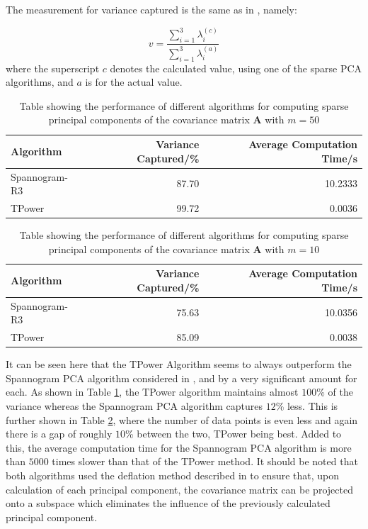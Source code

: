 \documentclass[11pt,a4paper]{article}
\begin{document}
The measurement for variance captured is the same as in \cite{dimakis}, namely:

\begin{equation*}
v = \frac{\sum_{i=1}^3\lambda^{(c)}_i}{\sum_{i=1}^3\lambda^{(a)}_i}
\end{equation*}
where the superscript $c$ denotes the calculated value, using one of the sparse PCA algorithms, and $a$ is for the actual value.

\begin{table}[H]
\center
\begin{tabular}{|l|r|r|}
\hline
Algorithm & Variance Captured/\% & Average Computation Time/s\\
\hline
Spannogram-R3 & 87.70 & 10.2333\\
TPower & 99.72 & 0.0036\\
\hline

\end{tabular}
\caption{Table showing the performance of different algorithms for computing sparse principal components of the covariance matrix $\mathbf{A}$ with $m=50$}
\label{performance_50}
\end{table}

\begin{table}[H]
\center
\begin{tabular}{|l|r|r|}
\hline
Algorithm & Variance Captured/\% & Average Computation Time/s\\
\hline
Spannogram-R3 & 75.63 & 10.0356\\
TPower & 85.09 & 0.0038\\
\hline

\end{tabular}
\caption{Table showing the performance of different algorithms for computing sparse principal components of the covariance matrix $\mathbf{A}$ with $m=10$}
\label{performance_10}
\end{table}

It can be seen here that the TPower Algorithm seems to always outperform the Spannogram PCA algorithm considered in \cite{dimakis}, and by a very significant amount for each. As shown in Table \ref{performance_50}, the TPower algorithm maintains almost $100$\% of the variance whereas the Spannogram PCA algorithm captures $12$\% less. This is further shown in Table \ref{performance_10}, where the number of data points is even less and again there is a gap of roughly $10$\% between the two, TPower being best. Added to this, the average computation time for the Spannogram PCA algorithm is more than $5000$ times slower than that of the TPower method. It should be noted that both algorithms used the deflation method described in \cite{Mackey_deflationmethods} to ensure that, upon calculation of each principal component, the covariance matrix can be projected onto a subspace which eliminates the influence of the previously calculated principal component.
\end{document}
